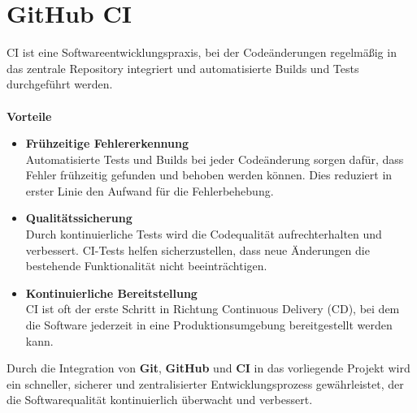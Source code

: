 \section{GitHub CI}
\label{sec:tooling-ci}
\ac{CI} ist eine Softwareentwicklungspraxis, bei der Codeänderungen regelmäßig in das zentrale Repository integriert und automatisierte Builds und Tests durchgeführt werden.\\\\
\textbf{Vorteile}
\begin{itemize}
    \item \textbf{Frühzeitige Fehlererkennung}\\
    Automatisierte Tests und Builds bei jeder Codeänderung sorgen dafür, dass Fehler frühzeitig gefunden und behoben werden können.
    Dies reduziert in erster Linie den Aufwand für die Fehlerbehebung.
    \item \textbf{Qualitätssicherung}\\
    Durch kontinuierliche Tests wird die Codequalität aufrechterhalten und verbessert.
    CI-Tests helfen sicherzustellen, dass neue Änderungen die bestehende Funktionalität nicht beeinträchtigen.
    \item \textbf{Kontinuierliche Bereitstellung}\\
    CI ist oft der erste Schritt in Richtung Continuous Delivery (CD), bei dem die Software jederzeit in eine Produktionsumgebung bereitgestellt werden kann.
\end{itemize}
Durch die Integration von \textbf{Git}, \textbf{GitHub} und \textbf{CI} in das vorliegende Projekt wird ein schneller, sicherer und zentralisierter Entwicklungsprozess gewährleistet, der die Softwarequalität kontinuierlich überwacht und verbessert.